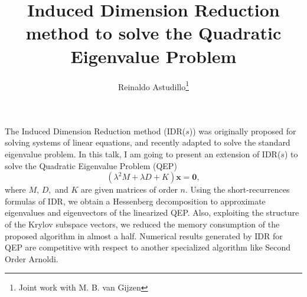 \documentclass{article}
\title{Induced Dimension Reduction method to solve the Quadratic Eigenvalue Problem}
\author{Reinaldo Astudillo\thanks{Joint work with M. B. van Gijzen}}
\affil{PhD student at TU Delft, The Netherlands}
\date{ }
\newcommand{\vv}[1]{\mathbf{#1}}
\begin{document}
\maketitle
\setcounter{page}{14}
    The Induced Dimension Reduction method (IDR($s$)) was
    originally proposed for solving systems of linear equations, and recently adapted 
    to solve the standard eigenvalue problem. In this talk,  I am going to present an extension of IDR($s$) to solve the Quadratic Eigenvalue Problem (QEP) 
    $$(\lambda^2 M + \lambda D + K)\vv{x} = \vv{0},$$
    where $M,\, D,$ and $K$ are given matrices of order $n$. Using the short-recurrences formulas of IDR, we obtain a Hessenberg decomposition to approximate eigenvalues and eigenvectors 
    of the linearized QEP. Also, exploiting the structure of the Krylov subspace vectors, we reduced the memory consumption of the proposed algorithm in almost a half.
    Numerical results generated by IDR for QEP  are competitive with respect to another specialized algorithm  
    like Second Order Arnoldi.
\end{document}
